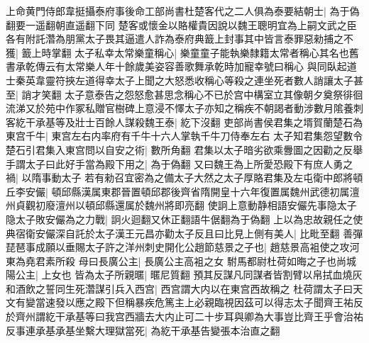 上命黄門侍郎韋挺攝泰府事後命工部尚書杜楚客代之二人俱為泰要結朝士|{
	為于偽翻要一遥翻朝直遥翻下同}
楚客或懷金以賂權貴因說以魏王聰明宜為上嗣文武之臣各有附託濳為朋黨太子畏其逼遣人詐為泰府典籖上封事其中皆言泰罪惡勑捕之不獲|{
	籖上時掌翻}
太子私幸太常樂童稱心|{
	樂童童子能執樂隸籍太常者稱心其名也舊書承乾傳云有太常樂人年十餘歲美姿容善歌舞承乾時加寵幸號曰稱心}
與同臥起道士秦英韋靈符挾左道得幸太子上聞之大怒悉收稱心等殺之連坐死者數人誚讓太子甚至|{
	誚才笑翻}
太子意泰告之怨怒愈甚思念稱心不已於宫中構室立其像朝夕奠祭徘徊流涕又於苑中作冢私贈官樹碑上意浸不懌太子亦知之稱疾不朝謁者動涉數月隂養刺客紇干承基等及壯士百餘人謀殺魏王泰|{
	紇下沒翻}
吏部尚書侯君集之壻賀蘭楚石為東宫千牛|{
	東宫左右内率府有千牛十六人掌執千牛刀侍奉左右}
太子知君集怨望數令楚石引君集入東宫問以自安之術|{
	數所角翻}
君集以太子暗劣欲乘釁圖之因勸之反舉手謂太子曰此好手當為殿下用之|{
	為于偽翻}
又曰魏王為上所愛恐殿下有庶人勇之禍|{
	以隋事動太子}
若有勑召宜密為之備太子大然之太子厚賂君集及左屯衛中郎將頓丘李安儼|{
	頓邱縣漢属東郡晉置頓邱郡後齊省隋開皇十六年復置属魏州武德初属澶州貞觀初廢澶州以頓邱縣還属於魏州將即亮翻}
使詗上意動静相語安儼先事隐太子隐太子敗安儼為之力戰|{
	詗火迴翻又休正翻語牛倨翻為于偽翻}
上以為忠故親任之使典宿衛安儼深自託於太子漢王元昌亦勸太子反且曰比見上側有美人|{
	比毗至翻}
善彈琵琶事成願以垂賜太子許之洋州刺史開化公趙節慈景之子也|{
	趙慈景高袓使之攻河東為堯君素所殺}
母曰長廣公主|{
	長廣公主高袓之女}
駙馬都尉杜荷如晦之子也尚城陽公主|{
	上女也}
皆為太子所親暱|{
	暱尼質翻}
預其反謀凡同謀者皆割臂以帛拭血燒灰和酒飲之誓同生死濳謀引兵入西宫|{
	西宫謂大内以在東宫西故稱之}
杜荷謂太子曰天文有變當速發以應之殿下但稱暴疾危篤主上必親臨視因茲可以得志太子聞齊王祐反於齊州謂紇干承基等曰我宫西牆去大内止可二十步耳與卿為大事豈比齊王乎會治祐反事連承基承基坐繫大理獄當死|{
	為紇干承基告變張本治直之翻}


